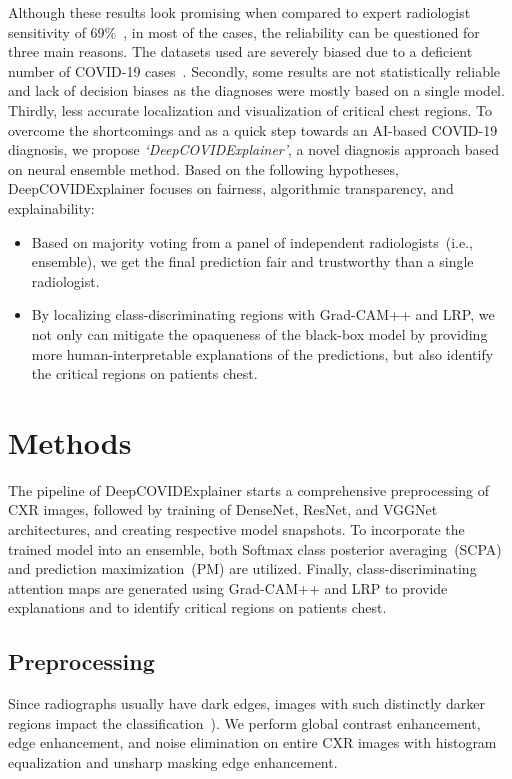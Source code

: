 \documentclass[conference]{IEEEtran}
\begin{document}
Although these results look promising when compared to expert radiologist sensitivity of 69\%~\cite{tabik2020covidgr}, in most of the cases, the reliability can be questioned for three main reasons. The datasets used are severely biased due to a deficient number of COVID-19 cases~\cite{tabik2020covidgr}. Secondly, some results are not statistically reliable and lack of decision biases as the diagnoses were mostly based on a single model. Thirdly, less accurate localization and visualization of critical chest regions.
\fi 
To overcome the shortcomings and as a quick step towards an AI-based COVID-19 diagnosis, we propose \emph{`DeepCOVIDExplainer'}, a novel diagnosis approach based on neural ensemble method. 
Based on the following hypotheses, DeepCOVIDExplainer focuses on fairness, algorithmic transparency, and explainability:

\begin{itemize}
    \item Based on majority voting from a panel of independent radiologists~(i.e., ensemble), we get the final prediction fair and trustworthy than a single radiologist.
    \item By localizing class-discriminating regions with Grad-CAM++ and LRP, we not only can mitigate the opaqueness of the black-box model by providing more human-interpretable explanations of the predictions, but also identify the critical regions on patients chest.
\end{itemize}

\section{Methods}
\label{sec:mm}
The pipeline of DeepCOVIDExplainer starts a comprehensive preprocessing of CXR images, followed by training of DenseNet, ResNet, and VGGNet architectures, and creating respective model snapshots. To incorporate the trained model into an ensemble, both Softmax class posterior averaging~(SCPA) and prediction maximization~(PM) are utilized. Finally, class-discriminating attention maps are generated using Grad-CAM++ and LRP to provide explanations and to identify critical regions on patients chest.

\subsection{Preprocessing}
Since radiographs usually have dark edges, images with such distinctly darker regions impact the  classification~\cite{86}). 
We perform global contrast enhancement, edge enhancement, and noise elimination on entire CXR images with histogram equalization and unsharp masking edge enhancement. %
\end{document}

